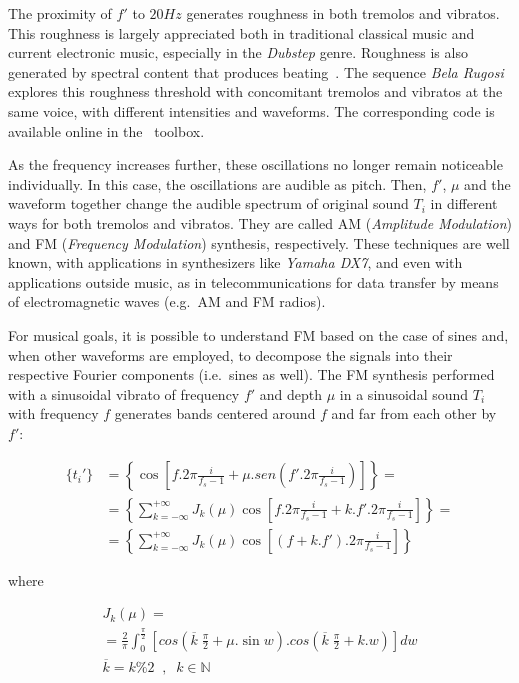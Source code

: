The proximity of $f'$ to $20Hz$ generates roughness in both tremolos and vibratos. This roughness is largely appreciated both in traditional classical music and current electronic music, especially in the \emph{Dubstep} genre. Roughness is also generated by spectral content that produces beating~\cite{Porres,porres2009}. The sequence \emph{Bela Rugosi} explores this roughness threshold with concomitant tremolos and vibratos at the same voice, with different intensities and waveforms. The corresponding code is available online in the \massa\ toolbox.

As the frequency increases further, these oscillations no longer remain noticeable individually. In this case, the oscillations are audible as pitch. Then, $f'$, $\mu$ and the waveform together change the audible spectrum of original sound $T_i$ in different ways for both tremolos and vibratos. They are called AM (\emph{Amplitude Modulation}) and FM (\emph{Frequency Modulation}) synthesis,
respectively. These techniques are well known, with applications in
synthesizers like \emph{Yamaha DX7}, and even with applications outside music, as in telecommunications for data transfer by means of electromagnetic waves (e.g.\ AM and FM radios).

For musical goals, it is possible to understand FM based on the
case of sines and, when other waveforms are employed, to decompose the signals into their respective Fourier components (i.e.\ sines as well). The FM synthesis performed with a sinusoidal vibrato of frequency $f'$ and depth $\mu$ in a sinusoidal sound $T_i$ with frequency $f$ generates bands centered around $f$ and far from each other by $f'$:

\begin{equation}\label{eq:fmEsp}
\begin{split}
\{t_i'\} & = \left \{ \cos \left [f . 2 \pi \frac{i}{f_s-1} + \mu . sen \left ( f' . 2 \pi \frac{i}{ f_s -1 } \right ) \right ] \right \} = \\
 & = \left \{ \sum_{k=-\infty}^{+\infty} J_k(\mu) \cos \left [ f . 2 \pi \frac{i}{f_s-1} + k . f' . 2 \pi \frac{i}{f_s-1} \right ]  \right \} = \\
 & = \left \{ \sum_{k=-\infty}^{+\infty} J_k(\mu) \cos \left [ (f+k.f') . 2 \pi \frac{i}{f_s-1} \right ]  \right \}
\end{split}
\end{equation}

\noindent where

\begin{multline}\label{eq:Bessel}
J_k(\mu) = \\ = \frac{2}{\pi} \int_0^{\frac{\pi}{2}}\left [ cos \left (\overline{k}\;\frac{\pi}{2} + \mu . \sin w \right ) . cos \left ( \overline{k}\;\frac{\pi}{2} + k . w \right ) \right ] dw \\  \overline{k} = k \% 2 \;\;,\;\; k \in \mathbb{N}
\end{multline}

